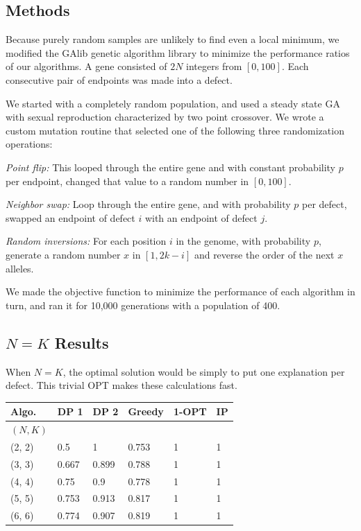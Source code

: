 \documentclass[11pt,twocolumn]{article}
\begin{document}
\subsection{Methods}

Because purely random samples are unlikely to find even a local minimum, we modified the GAlib genetic algorithm library \cite{GAlib} to minimize the performance ratios of our algorithms.  A gene consisted of $2N$ integers from $[0,100]$.  Each consecutive pair of endpoints was made into a defect.  

We started with a completely random population, and used a steady state GA with sexual reproduction characterized by two point crossover.  We wrote a custom mutation routine that selected one of the following three randomization operations:

{\it Point flip:} This looped through the entire gene and with constant probability $p$ per endpoint, changed that value to a random number in $[0,100]$.  

{\it Neighbor swap:} Loop through the entire gene, and with probability $p$ per defect, swapped an endpoint of defect $i$ with an endpoint of defect $j$.

{\it Random inversions:} For each position $i$ in the genome, with probability $p$, generate a random number $x$ in $[1,2k-i]$ and reverse the order of the next $x$ alleles.  

We made the objective function to minimize the performance of each algorithm in turn, and ran it for 10,000 generations with a population of 400.  

\subsection{$N=K$ Results}

When $N=K$, the optimal solution would be simply to put one explanation per defect.  This trivial OPT makes these calculations fast.

\begin{tabular}{l|lllll}
{\bf Algo.} & DP 1 & DP 2 & Greedy & 1-OPT  & IP \\ \hline
{\bf $(N,K)$ } \\
(2, 2) & 0.5 & 1 & 0.753 & 1 & 1 \\
(3, 3) & 0.667 & 0.899 & 0.788 & 1 & 1\\
(4, 4) & 0.75 & 0.9 & 0.778 & 1 & 1 \\
(5, 5) & 0.753 & 0.913 & 0.817 & 1 & 1 \\
(6, 6) & 0.774 & 0.907 & 0.819 & 1 & 1 \\
\end{tabular}
\end{document}
